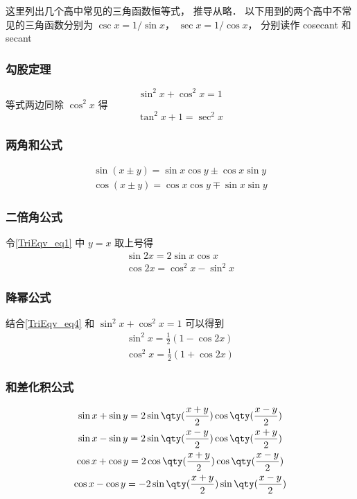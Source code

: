 

这里列出几个高中常见的三角函数恒等式， 推导从略． 以下用到的两个高中不常见的三角函数分别为 $\csc x= 1/\sin x$， $\sec x = 1/\cos x$， 分别读作 cosecant 和 secant

\subsubsection{勾股定理}

\begin{equation}\label{TriEqv_eq2}
\sin^2 x + \cos^2 x = 1
\end{equation}
等式两边同除 $\cos^2 x$ 得
\begin{equation}\label{TriEqv_eq13}
\tan^2 x + 1 = \sec^2 x
\end{equation}

\subsubsection{两角和公式}
\begin{gather}\label{TriEqv_eq1}
\sin(x\pm y) = \sin x\cos y \pm \cos x\sin y\\
\label{TriEqv_eq3}
\cos(x\pm y) = \cos x\cos y \mp \sin x\sin y
\end{gather}

\subsubsection{二倍角公式}

令\autoref{TriEqv_eq1} 中 $y=x$ 取上号得
\begin{gather}
\sin 2x = 2\sin x\cos x\\
 \cos 2x = \cos^2 x - \sin^2 x \label{TriEqv_eq4}
\end{gather}

\subsubsection{降幂公式}

结合\autoref{TriEqv_eq4} 和 $\sin^2 x + \cos^2 x = 1$ 可以得到
\begin{gather}
\sin^2 x = \frac12 (1- \cos 2x) \label{TriEqv_eq5} \\
\cos^2 x = \frac12 (1+\cos 2x) \label{TriEqv_eq6}
\end{gather}

\subsubsection{和差化积公式}
\begin{gather}
\sin x + \sin y = 2\sin\qty(\frac{x + y}{2})\cos\qty(\frac{x - y}{2})\label{TriEqv_eq7}\\
\sin x - \sin y = 2\sin\qty(\frac{x - y}{2})\cos\qty(\frac{x + y}{2})\label{TriEqv_eq8}\\
\cos x + \cos y = 2\cos\qty(\frac{x+y}{2})\cos\qty(\frac{x-y}{2})\label{TriEqv_eq9}\\
\cos x - \cos y = -2\sin\qty(\frac{x+y}{2})\sin\qty(\frac{x-y}{2})\label{TriEqv_eq10}
\end{gather}

